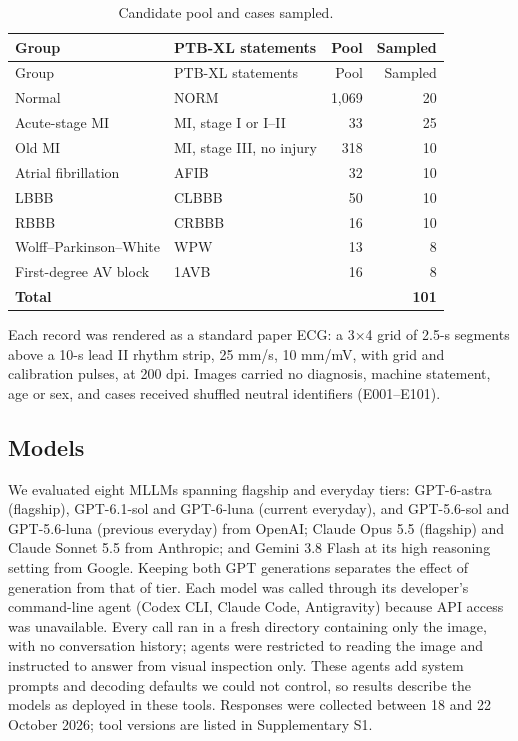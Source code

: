 \begin{longtable}[]{@{}llrr@{}}
\caption{Candidate pool and cases sampled.}\tabularnewline
\toprule\noalign{}
Group & PTB-XL statements & Pool & Sampled \\
\midrule\noalign{}
\endfirsthead
\toprule\noalign{}
Group & PTB-XL statements & Pool & Sampled \\
\midrule\noalign{}
\endhead
\bottomrule\noalign{}
\endlastfoot
Normal & NORM & 1,069 & 20 \\
Acute-stage MI & MI, stage I or I--II & 33 & 25 \\
Old MI & MI, stage III, no injury & 318 & 10 \\
Atrial fibrillation & AFIB & 32 & 10 \\
LBBB & CLBBB & 50 & 10 \\
RBBB & CRBBB & 16 & 10 \\
Wolff--Parkinson--White & WPW & 13 & 8 \\
First-degree AV block & 1AVB & 16 & 8 \\
\textbf{Total} & & & \textbf{101} \\
\end{longtable}

Each record was rendered as a standard paper ECG: a 3×4 grid of 2.5-s segments above a 10-s lead II rhythm strip, 25 mm/s, 10 mm/mV, with grid and calibration pulses, at 200 dpi. Images carried no diagnosis, machine statement, age or sex, and cases received shuffled neutral identifiers (E001--E101).

\subsection{Models}\label{models}

We evaluated eight MLLMs spanning flagship and everyday tiers: GPT-6-astra (flagship), GPT-6.1-sol and GPT-6-luna (current everyday), and GPT-5.6-sol and GPT-5.6-luna (previous everyday) from OpenAI; Claude Opus 5.5 (flagship) and Claude Sonnet 5.5 from Anthropic; and Gemini 3.8 Flash at its high reasoning setting from Google. Keeping both GPT generations separates the effect of generation from that of tier. Each model was called through its developer's command-line agent (Codex CLI, Claude Code, Antigravity) because API access was unavailable. Every call ran in a fresh directory containing only the image, with no conversation history; agents were restricted to reading the image and instructed to answer from visual inspection only. These agents add system prompts and decoding defaults we could not control, so results describe the models as deployed in these tools. Responses were collected between 18 and 22 October 2026; tool versions are listed in Supplementary S1.

